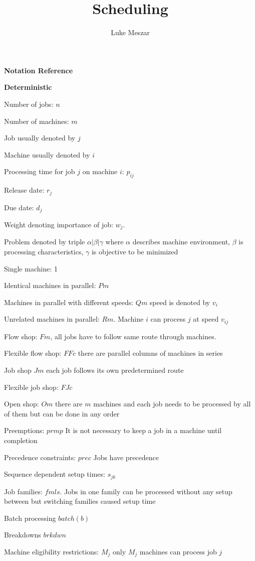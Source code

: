 \documentclass[12pt]{article}
\title{Scheduling}
\author{Luke Meszar}
\date{\empty}
\theoremstyle{definition}
\newlength\mystoreparindent
\newenvironment{myparindent}[1]{%
	\setlength{\mystoreparindent}{\the\parindent}
	\setlength{\parindent}{#1}
}{%
	\setlength{\parindent}{\mystoreparindent}
}
\numberwithin{equation}{section}
\begin{document}
\begin{myparindent}{0pt}
	\textbf{Notation Reference}
	
	\textbf{Deterministic}
	
	Number of jobs: $n$
	
	Number of machines: $m$
	
	Job usually denoted by $j$
	
	Machine usually denoted by $i$
	
	Processing time for job $j$ on machine $i$: $p_{ij}$
	
	Release date: $r_j$
	
	Due date: $d_j$
	
	Weight denoting importance of job: $w_j$.
	
	Problem denoted by triple $\alpha | \beta | \gamma$ where $\alpha$ describes machine environment, $\beta$ is processing characteristics, $\gamma$ is objective to be minimized
	
	Single machine: 1
	
	Identical machines in parallel: $Pm$
	
	Machines in parallel with different speeds: $Qm$ speed is denoted by $v_i$
	
	Unrelated machines in parallel: $Rm$. Machine $i$ can process $j$ at speed $v_{ij}$
	
	Flow shop: $Fm$, all jobs have to follow same route through machines. 
	
	Flexible flow shop: $FFc$ there are parallel columns of machines in series
	
	Job shop $Jm$ each job follows its own predetermined route
	
	Flexible job shop: $FJc$ 
	
	Open shop: $Om$ there are $m$ machines and each job needs to be processed by all of them but can be done in any order
	
	Preemptions: $prmp$ It is not necessary to keep a job in a machine until completion
	
	Precedence constraints: $prec$ Jobs have precedence
	
	Sequence dependent setup times: $s_{jk}$
	
	Job families: $fmls$. Jobs in one family can be processed without any setup between but switching families caused setup time
	
	Batch processing $batch(b)$
	
	Breakdowns $brkdwn$ 
	
	Machine eligibility restrictions: $M_j$ only $M_j$ machines can process job $j$
	

\end{myparindent}
\end{document}
